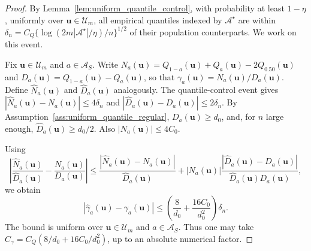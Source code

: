 \documentclass[10pt,a4paper]{amsart}
\newcommand{\abs}[1]{\left\lvert #1 \right\rvert}
\def\u{\bm{u}}
\begin{document}
\begin{proof}
	By Lemma~\ref{lem:uniform_quantile_control}, with probability at least \(1-\eta\), uniformly over \(\u\in\mathcal U_m\), all empirical quantiles indexed by \(\mathcal A^\star\) are within \(\delta_n=C_Q\{\log(2m|\mathcal A^\star|/\eta)/n\}^{1/2}\) of their population counterparts. We work on this event.

	Fix \(\u\in\mathcal U_m\) and \(a\in\mathcal A_S\). Write \(N_a(\u)=Q_{1-a}(\u)+Q_a(\u)-2Q_{0.50}(\u)\) and \(D_a(\u)=Q_{1-a}(\u)-Q_a(\u)\), so that \(\gamma_{a}(\u)=N_a(\u)/D_a(\u)\). Define \(\widehat N_a(\u)\) and \(\widehat D_a(\u)\) analogously. The quantile-control event gives \(|\widehat N_a(\u)-N_a(\u)|\leqslant 4\delta_n\) and \(|\widehat D_a(\u)-D_a(\u)|\leqslant 2\delta_n\). By Assumption~\ref{ass:uniform_quantile_regular}, \(D_a(\u)\geqslant d_0\), and, for \(n\) large enough, \(\widehat D_a(\u)\geqslant d_0/2\). Also \(|N_a(\u)|\leqslant 4C_0\).

	Using
	\[
	\left|
	\frac{\widehat N_a(\u)}{\widehat D_a(\u)}
	-
	\frac{N_a(\u)}{D_a(\u)}
	\right|
	\le
	\frac{|\widehat N_a(\u)-N_a(\u)|}{\widehat D_a(\u)}
	+
	|N_a(\u)|
	\frac{|\widehat D_a(\u)-D_a(\u)|}{\widehat D_a(\u)D_a(\u)},
	\]
	we obtain
	\[
    \abs{\widehat\gamma_{a}(\u)-\gamma_{a}(\u)} \leqslant \left(\frac{8}{d_0}+\frac{16C_0}{d_0^2}\right)\delta_n .
	\]
	The bound is uniform over \(\u\in\mathcal U_m\) and \(a\in\mathcal A_S\). Thus one may take \(C_\gamma=C_Q(8/d_0+16C_0/d_0^2)\), up to an absolute numerical factor.
\end{proof}
\end{document}

